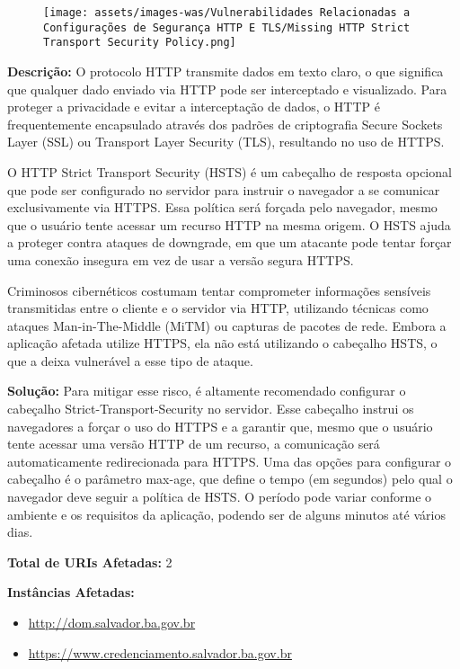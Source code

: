 \documentclass[a4paper,12pt]{article}
\begin{document}
\begin{enumerate}
                        \begin{figure}[h!]
                        \centering
                        \texttt{[image: assets/images-was/Vulnerabilidades Relacionadas a Configurações de Segurança HTTP E TLS/Missing HTTP Strict Transport Security Policy.png]}
                        \end{figure}
                        \FloatBarrier
                        \textbf{Descrição:} O protocolo HTTP transmite dados em texto claro, o que significa que qualquer dado enviado via HTTP pode ser interceptado e visualizado. Para proteger a privacidade e evitar a interceptação de dados, o HTTP é frequentemente encapsulado através dos padrões de criptografia Secure Sockets Layer (SSL) ou Transport Layer Security (TLS), resultando no uso de HTTPS.

O HTTP Strict Transport Security (HSTS) é um cabeçalho de resposta opcional que pode ser configurado no servidor para instruir o navegador a se comunicar exclusivamente via HTTPS. Essa política será forçada pelo navegador, mesmo que o usuário tente acessar um recurso HTTP na mesma origem. O HSTS ajuda a proteger contra ataques de downgrade, em que um atacante pode tentar forçar uma conexão insegura em vez de usar a versão segura HTTPS.

Criminosos cibernéticos costumam tentar comprometer informações sensíveis transmitidas entre o cliente e o servidor via HTTP, utilizando técnicas como ataques Man-in-The-Middle (MiTM) ou capturas de pacotes de rede. Embora a aplicação afetada utilize HTTPS, ela não está utilizando o cabeçalho HSTS, o que a deixa vulnerável a esse tipo de ataque.

\textbf{Solução:} Para mitigar esse risco, é altamente recomendado configurar o cabeçalho Strict-Transport-Security no servidor. Esse cabeçalho instrui os navegadores a forçar o uso do HTTPS e a garantir que, mesmo que o usuário tente acessar uma versão HTTP de um recurso, a comunicação será automaticamente redirecionada para HTTPS. Uma das opções para configurar o cabeçalho é o parâmetro max-age, que define o tempo (em segundos) pelo qual o navegador deve seguir a política de HSTS. O período pode variar conforme o ambiente e os requisitos da aplicação, podendo ser de alguns minutos até vários dias.

\textbf{Total de URIs Afetadas:} 2

\textbf{Instâncias Afetadas:}
\begin{itemize}
    \item \url{http://dom.salvador.ba.gov.br}
    \item \url{https://www.credenciamento.salvador.ba.gov.br}
\end{itemize}


\end{enumerate}
\end{document}
